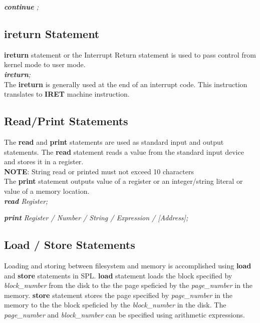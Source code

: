 \documentclass[11pt]{article}
\begin{document}
\textit{\textbf{continue} ;}

\subsection{ireturn Statement}
\textbf{ireturn} statement or the Interrupt Return statement is used to pass control from kernel mode to user mode.   \\ 

\textit{\textbf{ireturn}; }\\

The \textbf{ireturn} is generally used at the end of an interrupt code. This instruction translates to \textbf{IRET} machine instruction.




\subsection{Read/Print Statements}
The \textbf{read} and \textbf{print} statements are used as standard input and output statements. The \textbf{read} statement reads a value from the standard input device and stores it in a register.\\
\textbf{NOTE}: String read or printed must not exceed 10 characters\\
The \textbf{print} statement outputs value of a register or an integer/string literal or value of a memory location.\\

   \textit{\textbf{read} Register;} 
   
   \textit{\textbf{print} Register / Number / String / Expression / [Address];}



\subsection{Load / Store Statements}
Loading and storing between filesystem and memory is accomplished using \textbf{load} and \textbf{store} statements in SPL. \textbf{load} statement loads the block specified by \textit{block\_number} from the disk to the the page speficied by the \textit{page\_number} in the memory. \textbf{store} statement stores the page specified by \textit{page\_number} in the memory to the the block speficied by the \textit{block\_number} in the disk. The \textit{page\_number} and \textit{block\_number} can be specified using arithmetic expressions.\\
\end{document}
